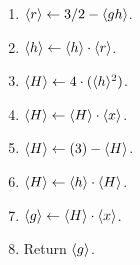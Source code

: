\begin{enumerate}
\begin{enumerate}
\end{enumerate}
\item $\langle r \rangle \leftarrow 3/2-\langle gh \rangle$.
\item $\langle h \rangle \leftarrow \langle h \rangle \cdot \langle r \rangle$.
\item $\langle H \rangle \leftarrow 4 \cdot (\langle h \rangle^2)$.
\item $\langle H \rangle \leftarrow \langle H \rangle\cdot \langle x \rangle$.
\item $\langle H \rangle \leftarrow (3) - \langle H \rangle$.
\item $\langle H \rangle \leftarrow \langle h \rangle \cdot \langle H \rangle$.
\item $\langle g \rangle \leftarrow \langle H \rangle \cdot \langle x \rangle$.
\item Return $\langle g \rangle$.
\end{enumerate}

